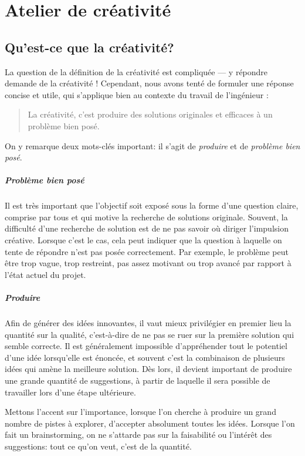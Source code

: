 \section{Atelier de créativité}
\subsection{Qu'est-ce que la créativité?}

La question de la définition de la créativité est compliquée --- y répondre demande de la créativité ! Cependant, nous avons tenté de formuler une réponse concise et utile, qui s'applique bien au contexte du travail de l'ingénieur :
\begin{quote}
    La créativité, c'est produire des solutions originales et efficaces à un problème bien posé.
\end{quote}
On y remarque deux mots-clés important: il s'agit de \emph{produire} et de \emph{problème bien posé}.

\subparagraph{Problème bien posé} Il est très important que l'objectif soit exposé sous la forme d'une question claire, comprise par tous et qui motive la recherche de solutions originale. Souvent, la difficulté d'une recherche de solution est de ne pas savoir où diriger l'impulsion créative. Lorsque c'est le cas, cela peut indiquer que la question à laquelle on tente de répondre n'est pas posée correctement. Par exemple, le problème peut être trop vague, trop restreint, pas assez motivant ou trop avancé par rapport à l'état actuel du projet.

\subparagraph{Produire} Afin de générer des idées innovantes, il vaut mieux privilégier en premier lieu la quantité sur la qualité, c'est-à-dire de ne pas se ruer sur la première solution qui semble correcte. Il est généralement impossible d'appréhender tout le potentiel d'une idée lorsqu'elle est énoncée, et souvent c'est la combinaison de plusieurs idées qui amène la meilleure solution\footnotemark. Dès lors, il devient important de produire une grande quantité de suggestions, à partir de laquelle il sera possible de travailler lors d'une étape ultérieure.


Mettons l'accent sur l'importance, lorsque l'on cherche à produire un grand nombre de pistes à explorer, d'accepter absolument toutes les idées. Lorsque l'on fait un brainstorming, on ne s'attarde pas sur la faisabilité ou l'intérêt des suggestions: tout ce qu'on veut, c'est de la quantité.

